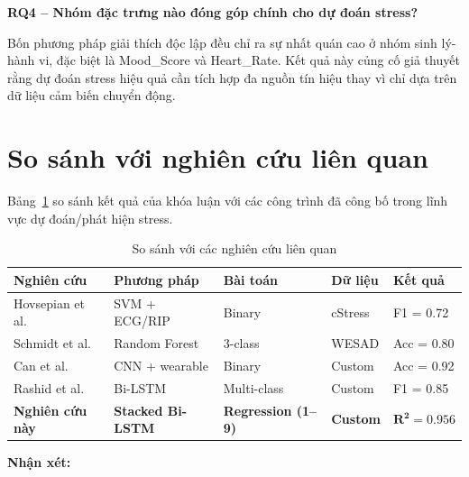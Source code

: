 \textbf{RQ4 -- Nhóm đặc trưng nào đóng góp chính cho dự đoán stress?}

Bốn phương pháp giải thích độc lập đều chỉ ra sự nhất quán cao ở nhóm sinh lý-hành vi, đặc biệt là Mood\_Score và Heart\_Rate. Kết quả này củng cố giả thuyết rằng dự đoán stress hiệu quả cần tích hợp đa nguồn tín hiệu thay vì chỉ dựa trên dữ liệu cảm biến chuyển động.


\section{So sánh với nghiên cứu liên quan}
\label{sec:related_comparison}

Bảng~\ref{tab:related_work_comparison} so sánh kết quả của khóa luận với các công trình đã công bố trong lĩnh vực dự đoán/phát hiện stress.

\begin{table}[H]
\centering
\caption{So sánh với các nghiên cứu liên quan}
\label{tab:related_work_comparison}
\small
\begin{tabular}{|l|l|l|l|l|}
\hline
\textbf{Nghiên cứu} & \textbf{Phương pháp} & \textbf{Bài toán} & \textbf{Dữ liệu} & \textbf{Kết quả} \\
\hline
Hovsepian et al. \cite{hovsepian2015cstress} & SVM + ECG/RIP & Binary & cStress & F1 = 0.72 \\
Schmidt et al. \cite{schmidt2018wesad} & Random Forest & 3-class & WESAD & Acc = 0.80 \\
Can et al. \cite{can2019stress} & CNN + wearable & Binary & Custom & Acc = 0.92 \\
Rashid et al. \cite{rashid2024stress} & Bi-LSTM & Multi-class & Custom & F1 = 0.85 \\
\hline
\textbf{Nghiên cứu này} & \textbf{Stacked Bi-LSTM} & \textbf{Regression (1--9)} & \textbf{Custom} & $\mathbf{R^2 = 0.956}$ \\
\hline
\end{tabular}
\end{table}

\textbf{Nhận xét:}

